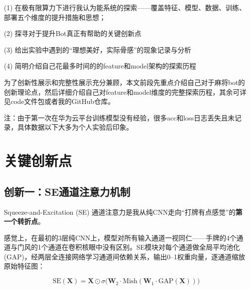 \documentclass{article}
\begin{document}
(1) 在极有限算力下进行我认为能系统的探索——覆盖特征、模型、数据、训练、部署五个维度的提升措施和思想；

(2) 探寻对于提升Bot真正有帮助的关键创新点

(3) 给出实验中遇到的``理想美好，实际骨感''的现象记录与分析

(4) 简明介绍自己花最多时间的的feature和model架构的探索历程

为了创新性展示和完整性展示充分兼顾，本文前段先重点介绍自己对于麻将bot的创新理论点，然后详细介绍自己对feature和model维度的完整探索历程，其余可详见code文件包或者我的GitHub仓库。

注：由于第一次在华为云平台训练模型没有经验，很多acc和loss日志丢失且未记录，具体数据以下大多为个人实验后印象。

\section{关键创新点}

\subsection{创新一：SE通道注意力机制}

Squeeze-and-Excitation (SE) 通道注意力是我从纯CNN走向``打牌有点感觉''的\textbf{第一个转折点}。

感觉上，在最初的3层纯CNN上，模型对所有输入通道一视同仁——手牌的4个通道与门风的1个通道在卷积核眼中没有区别。SE模块对每个通道做全局平均池化(GAP)，经两层全连接网络学习通道间依赖关系，输出0--1权重向量，逐通道缩放原始特征图：

\begin{equation}
\text{SE}(\mathbf{X}) = \mathbf{X} \odot \sigma\big(\mathbf{W}_2 \cdot \text{Mish}(\mathbf{W}_1 \cdot \text{GAP}(\mathbf{X}))\big)
\end{equation}
\end{document}
